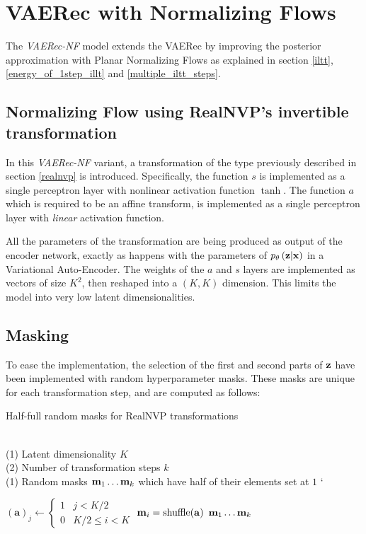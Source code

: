 \section{VAERec with Normalizing Flows}

The \emph{VAERec-NF} model
extends the VAERec by improving the posterior approximation
with Planar Normalizing Flows \cite{1505.05770}
as explained in section \ref{iltt}, 
\ref{energy_of_1step_illt}
and \ref{multiple_iltt_steps}.

\subsection{Normalizing Flow using RealNVP's invertible transformation}

In this \emph{VAERec-NF} variant, a transformation of the type previously described
in section \ref{realnvp} is introduced.
Specifically, the function $s$ is implemented as
a single perceptron layer with nonlinear activation function 
$\tanh$. The function $a$ which is required to be an affine transform,
is implemented as a single perceptron layer with \emph{linear}
activation function.

All the parameters of the transformation are being produced as output of the
encoder network, exactly as happens with the parameters of $p_\theta\left(\mathbf{z}|\mathbf{x}\right)$ in a Variational
Auto-Encoder.
The weights of the $a$ and $s$ layers are implemented as vectors of size $K^2$, then
reshaped into a $(K,K)$ dimension. This limits the model into
very low latent dimensionalities.

\subsection{Masking}

To ease the implementation, the selection of the first and second parts of $\mathbf{z}$
have been implemented with random hyperparameter masks. These masks are unique for each transformation
step, and are computed as follows:

\begin{algorithm}[H]
\caption{Half-full random masks for RealNVP transformations}
\begin{algorithmic}[1]

\REQUIRE ~~\\
(1) Latent dimensionality $K$ \\
(2) Number of transformation steps $k$
\ENSURE~~\\
(1) Random masks $\mathbf{m}_1 \ldots \mathbf{m}_k$ which have half of their elements set at $1$
`
\item[]
\STATE $(\mathbf{a})_j \leftarrow \left\{\begin{array}{ll} 1 & j < K/2 \\ 0 & K/2 \leq i < K\end{array}\right.$
\STATE $\mathbf{m}_i = \mathrm{shuffle}(\mathbf{a})$
\ENDFOR
\RETURN $\mathbf{m}_1 \ldots \mathbf{m}_k$
\end{algorithmic}
\end{algorithm}
                                         
